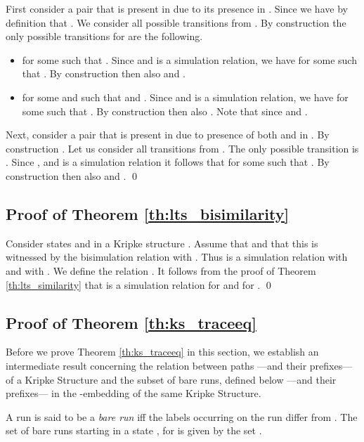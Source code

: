 \documentclass{llncs}
\begin{document}
First consider a pair  that is present in  due to its presence in . Since  we have by definition that .
We consider all possible transitions from . By construction the only possible transitions for  are the following.

\begin{itemize}
\item  for some  such that . Since  and  is a simulation relation, we have  for some  such that . By construction then also  and .
\item  for some  and  such that  and . Since  and  is a simulation relation, we have  for some  such that . By construction then also . Note that  since  and .
\end{itemize}


Next, consider a pair  that is present in  due to presence of both  and  in . By construction . Let us consider all transitions from .
The only possible transition is . Since ,  and  is a simulation relation it follows that  for some  such that . By construction then also  and . \qed


\subsection{Proof of Theorem \ref{th:lts_bisimilarity}}
\label{pf:th:lts_bisimilarity}

Consider states  and  in a Kripke structure . Assume that  and that this is witnessed by the bisimulation relation  with . Thus  is a simulation relation with  and with .
We define the relation . It follows from the proof of Theorem \ref{th:lts_similarity} that  is a simulation relation for  and for . \qed

\subsection{Proof of Theorem \ref{th:ks_traceeq}}
\label{pf:th:ks_traceeq}

Before we prove Theorem \ref{th:ks_traceeq} in this section, we establish
an intermediate result concerning the relation between paths ---and
their prefixes--- of a Kripke Structure and the subset of bare runs,
defined below ---and their prefixes--- in the \LTS-embedding of the same
Kripke Structure.


\begin{definition} A run  is said
to be a \emph{bare run} iff the labels occurring on the run differ from
. The set of bare runs starting in a state , for 
is given by the set .
\end{definition}
\newcommand{\prefruns}[1]{\ensuremath{\mathsf{Runs}^p(#1)}}
\newcommand{\prefbareruns}[1]{\ensuremath{\mathsf{Runs}^p_b(#1)}}
\newcommand{\bare}[1]{\ensuremath{\beta(#1)}}
\end{document}
